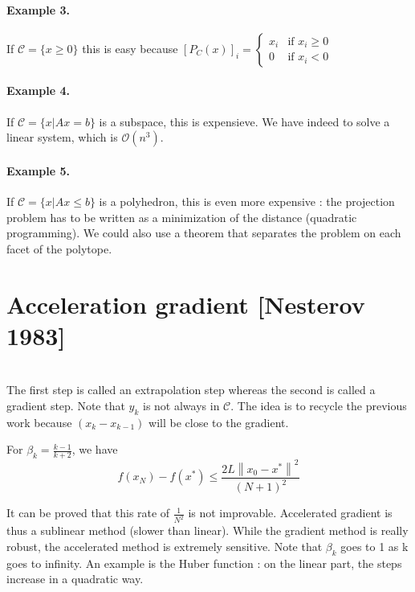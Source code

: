 \documentclass[a4paper]{article}
\begin{document}
\paragraph{Example 3.} If $\mathcal{C}=\{x\ge0\}$ this is easy because $[P_C(x)]_i=\left\lbrace
\begin{array}{ll}
x_i & \mbox{if $x_i \ge 0$}\\
0 & \mbox{if $x_i < 0$}
\end{array}
\right.$

\paragraph{Example 4.} If $\mathcal{C}=\{x|Ax=b\}$ is a subspace, this is expensieve. We have indeed to solve a linear system, which is $\mathcal{O}(n^3)$.
\paragraph{Example 5.} If $\mathcal{C}=\{x|Ax\leq b\}$ is a polyhedron, this is even more expensive : the projection problem has to be written as a minimization of the distance (quadratic programming). We could also use a theorem that separates the problem on each facet of the polytope.

\section{Acceleration gradient [Nesterov 1983]}
\hspace*{2cm}
~~\\ \newline
\noindent
The first step is called an extrapolation step whereas the second is called a gradient step. Note that $y_k$ is not always in $\mathcal{C}$. The idea is to recycle the previous work because $(x_k - x_{k-1})$ will be close to the gradient.

\begin{theo1}
For $\beta_k=\frac{k-1}{k+2}$, we have
\begin{equation*}
f(x_N) -  f(x^*) \leq \frac{2L\left\|x_0 - x^*\right\|^2}{(N+1)^2}
\end{equation*}
\end{theo1}
\noindent
It can be proved that this rate of $\frac{1}{N^2}$ is not improvable. Accelerated gradient is thus a sublinear method (slower than linear). While the gradient method is really robust, the accelerated method is extremely sensitive. Note that $\beta_k$ goes to 1 as k goes to infinity. An example is the Huber function : on the linear part, the steps increase in a quadratic way.
\end{document}
